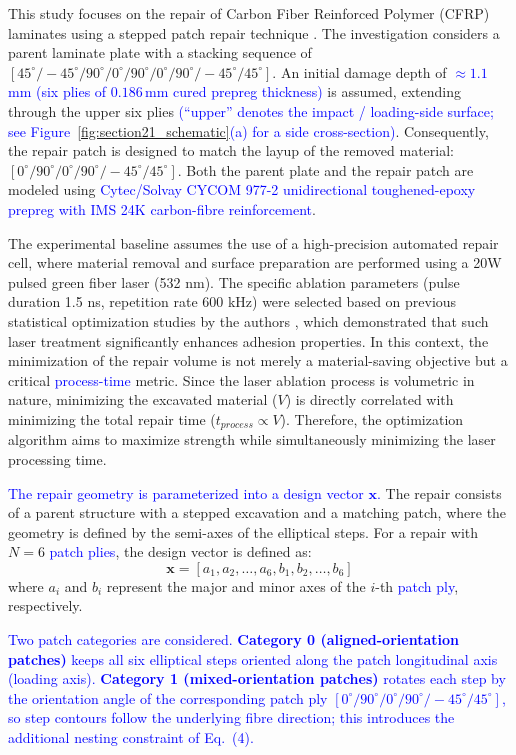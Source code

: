 \documentclass[
  preprint,
  12pt,
  a4paper
]{elsarticle}
\newcommand{\new}[1]{\textcolor{blue}{#1}}
\begin{document}
This study focuses on the repair of Carbon Fiber Reinforced Polymer (CFRP) laminates using a stepped patch repair technique \cite{psarras2024design}. The investigation considers a parent laminate plate with a stacking sequence of $[45^\circ/-45^\circ/90^\circ/0^\circ/90^\circ/0^\circ/90^\circ/-45^\circ/45^\circ]$. An initial damage depth of \new{$\approx 1.1$\,mm (six plies of $0.186$\,mm cured prepreg thickness)} is assumed, extending through the upper six plies \new{(``upper'' denotes the impact / loading-side surface; see Figure~\ref{fig:section21_schematic}(a) for a side cross-section)}. Consequently, the repair patch is designed to match the layup of the removed material: $[0^\circ/90^\circ/0^\circ/90^\circ/-45^\circ/45^\circ]$. Both the parent plate and the repair patch are modeled using \new{Cytec/Solvay CYCOM 977-2 unidirectional toughened-epoxy prepreg with IMS 24K carbon-fibre reinforcement}.

The experimental baseline assumes the use of a high-precision automated repair cell, where material removal and surface preparation are performed using a 20W pulsed green fiber laser (532 nm). The specific ablation parameters (pulse duration 1.5 ns, repetition rate 600 kHz) were selected based on previous statistical optimization studies by the authors \cite{psarras2020evaluating}, which demonstrated that such laser treatment significantly enhances adhesion properties. In this context, the minimization of the repair volume is not merely a material-saving objective but a critical \new{process-time} metric. Since the laser ablation process is volumetric in nature, minimizing the excavated material ($V$) is directly correlated with minimizing the total repair time ($t_{process} \propto V$). Therefore, the optimization algorithm aims to maximize strength while simultaneously minimizing the laser processing time.

\new{The repair geometry is parameterized into a design vector $\mathbf{x}$.} The repair consists of a parent structure with a stepped excavation and a matching patch, where the geometry is defined by the semi-axes of the elliptical steps. For a repair with $N=6$ \new{patch plies}, the design vector is defined as:
\begin{equation}
    \mathbf{x} = [a_1, a_2, \dots, a_6, b_1, b_2, \dots, b_6]
\end{equation}
where $a_i$ and $b_i$ represent the major and minor axes of the $i$-th \new{patch ply}, respectively.

\new{Two patch categories are considered. \textbf{Category 0 (aligned-orientation patches)} keeps all six elliptical steps oriented along the patch longitudinal axis (loading axis). \textbf{Category 1 (mixed-orientation patches)} rotates each step by the orientation angle of the corresponding patch ply $[0^\circ/90^\circ/0^\circ/90^\circ/-45^\circ/45^\circ]$, so step contours follow the underlying fibre direction; this introduces the additional nesting constraint of Eq.~(4).}
\end{document}
